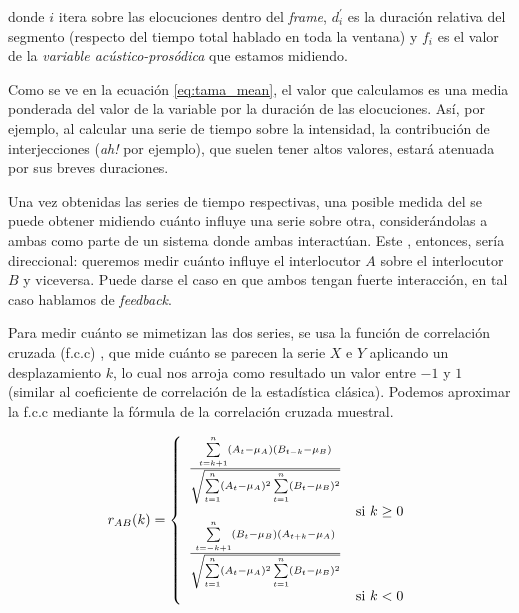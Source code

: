 \noindent donde $i$ itera sobre las elocuciones dentro del \emph{frame}, $d_i^\prime$ es la duración relativa del segmento (respecto del tiempo total hablado en toda la ventana) y $f_i$ es el valor de la \emph{variable acústico-prosódica} que estamos midiendo.

Como se ve en la ecuación \ref{eq:tama_mean}, el valor que calculamos es una media ponderada del valor de la variable por la duración de las elocuciones. Así, por ejemplo, al calcular una serie de tiempo sobre la intensidad, la contribución de interjecciones (\emph{ah!} por ejemplo), que suelen tener altos valores, estará atenuada por sus breves duraciones.

\newcommand{\squarederr}[1]{
    \sum\limits_{t=1}^n \varnorm{#1}^2
}

\newcommand{\crosscorr}[2]{
  \frac{\sum\limits_{t=|k|+1}^n \varnorm{#1} (#2_{t-k} - \mu_{#2})}{
    \sqrt{\squarederr{#1} \squarederr{#2}}
  } \\
}

\newcommand{\corrdenom}{\sqrt{\squarederr{A}\squarederr{B}}}


Una vez obtenidas las series de tiempo respectivas, una posible medida del \entrainment se puede obtener midiendo cuánto influye una serie sobre otra, considerándolas a ambas como parte de un sistema donde ambas interactúan. Este \entrainment, entonces, sería direccional: queremos medir cuánto influye el interlocutor $A$ sobre el interlocutor $B$ y viceversa. Puede darse el caso en que ambos tengan fuerte interacción, en tal caso hablamos de \emph{feedback}.

Para medir cuánto se mimetizan las dos series, se usa la función de correlación cruzada (f.c.c) \cite{CHATFIELD}, que mide cuánto se parecen la serie $X$ e $Y$ aplicando un desplazamiento $k$, lo cual nos arroja como resultado un valor entre $-1$ y $1$ (similar al coeficiente de correlación de la estadística clásica). Podemos aproximar la f.c.c mediante la fórmula de la correlación cruzada muestral.

\begin{equation}
  \label{cross_correlation_definition}
  r_{AB}(k) =
  \left\{
    \begin{array}{ll}
      \frac{\sum\limits_{t=k+1}^n \varnorm{A} (B_{t-k} - \mu_{B})}{\corrdenom} \\ & \mbox{si } k \geq 0 \\
      \frac{\sum\limits_{t=-k+1}^n \varnorm{B} (A_{t+k} - \mu_{A})}{\corrdenom} \\  & \mbox{si } k < 0
    \end{array}
  \right.
\end{equation}

